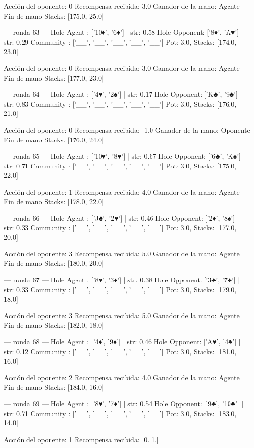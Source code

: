 Acción del oponente: 0
Recompensa recibida: 3.0
Ganador de la mano: Agente
Fin de mano Stacks: [175.0, 25.0]


--- ronda 63 ---
Hole Agent : ['10♦', '6♦'] | str: 0.58
Hole Opponent: ['8♦', 'A♥'] | str: 0.29
Community  : ['__', '__', '__', '__', '__']
Pot: 3.0, Stacks: [174.0, 23.0]

Acción del oponente: 0
Recompensa recibida: 3.0
Ganador de la mano: Agente
Fin de mano Stacks: [177.0, 23.0]


--- ronda 64 ---
Hole Agent : ['4♥', '2♠'] | str: 0.17
Hole Opponent: ['K♣', '9♣'] | str: 0.83
Community  : ['__', '__', '__', '__', '__']
Pot: 3.0, Stacks: [176.0, 21.0]

Acción del oponente: 0
Recompensa recibida: -1.0
Ganador de la mano: Oponente
Fin de mano Stacks: [176.0, 24.0]


--- ronda 65 ---
Hole Agent : ['10♥', '8♥'] | str: 0.67
Hole Opponent: ['6♣', 'K♠'] | str: 0.71
Community  : ['__', '__', '__', '__', '__']
Pot: 3.0, Stacks: [175.0, 22.0]

Acción del oponente: 1
Recompensa recibida: 4.0
Ganador de la mano: Agente
Fin de mano Stacks: [178.0, 22.0]


--- ronda 66 ---
Hole Agent : ['J♣', '2♥'] | str: 0.46
Hole Opponent: ['2♦', '8♠'] | str: 0.33
Community  : ['__', '__', '__', '__', '__']
Pot: 3.0, Stacks: [177.0, 20.0]

Acción del oponente: 3
Recompensa recibida: 5.0
Ganador de la mano: Agente
Fin de mano Stacks: [180.0, 20.0]


--- ronda 67 ---
Hole Agent : ['8♥', '3♦'] | str: 0.38
Hole Opponent: ['3♣', '7♣'] | str: 0.33
Community  : ['__', '__', '__', '__', '__']
Pot: 3.0, Stacks: [179.0, 18.0]

Acción del oponente: 3
Recompensa recibida: 5.0
Ganador de la mano: Agente
Fin de mano Stacks: [182.0, 18.0]


--- ronda 68 ---
Hole Agent : ['4♦', '9♦'] | str: 0.46
Hole Opponent: ['A♥', '4♣'] | str: 0.12
Community  : ['__', '__', '__', '__', '__']
Pot: 3.0, Stacks: [181.0, 16.0]

Acción del oponente: 2
Recompensa recibida: 4.0
Ganador de la mano: Agente
Fin de mano Stacks: [184.0, 16.0]


--- ronda 69 ---
Hole Agent : ['8♥', '7♦'] | str: 0.54
Hole Opponent: ['9♣', '10♣'] | str: 0.71
Community  : ['__', '__', '__', '__', '__']
Pot: 3.0, Stacks: [183.0, 14.0]

Acción del oponente: 1
Recompensa recibida: [0. 1.]

